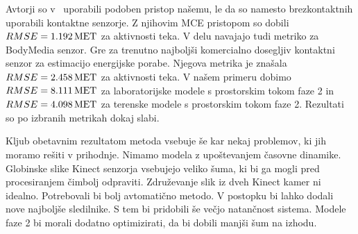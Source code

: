 Avtorji so v~\cite{gjoreski2015context} uporabili podoben pristop našemu, le da so namesto brezkontaktnih uporabili kontaktne senzorje. Z njihovim MCE pristopom so dobili ${RMSE}=\SI{1.192}{MET}$ za aktivnosti teka. V delu navajajo tudi metriko za BodyMedia senzor. Gre za trenutno najboljši komercialno dosegljiv kontaktni senzor za estimacijo energijske porabe. Njegova metrika je znašala ${RMSE}=\SI{2.458}{MET}$ za aktivnosti teka. V našem primeru dobimo ${RMSE}=\SI{8.111}{MET}$ za laboratorijske modele s prostorskim tokom faze 2 in ${RMSE}=\SI{4.098}{MET}$ za terenske modele s prostorskim tokom faze 2. Rezultati so po izbranih metrikah dokaj slabi. 

Kljub obetavnim rezultatom metoda vsebuje še kar nekaj problemov, ki jih moramo rešiti v prihodnje. Nimamo modela z upoštevanjem časovne dinamike. Globinske slike Kinect senzorja vsebujejo veliko šuma, ki bi ga mogli pred procesiranjem čimbolj odpraviti. Združevanje slik iz dveh Kinect kamer ni idealno. Potrebovali bi bolj avtomatično metodo. V postopku bi lahko dodali nove najboljše sledilnike. S tem bi pridobili še večjo natančnost sistema. Modele faze 2 bi morali dodatno optimizirati, da bi dobili manjši šum na izhodu.